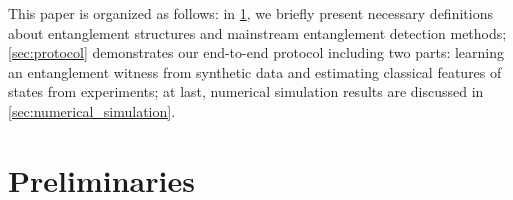 \documentclass[
aps,
pra,
twocolumn,
floatfix,
]{revtex4-2}
\theoremstyle{plain}
\theoremstyle{definition}
\newtheorem{notation}{Notation}
\newcommand{\ew}{W}
\newcommand{\ob}{O}
\newcommand{\dm}{\rho}
\newcommand{\hamiltonian}{\hat{H}}
\begin{document}
This paper is organized as follows: in \cref{sec:preliminaries}, we briefly present necessary definitions about entanglement structures and mainstream entanglement detection methods;
\cref{sec:protocol} demonstrates our end-to-end protocol including two parts: learning an entanglement witness from synthetic data and estimating classical features of states from experiments;
at last, numerical simulation results are discussed in \cref{sec:numerical_simulation}.

\section{Preliminaries}\label{sec:preliminaries}

\end{document}
